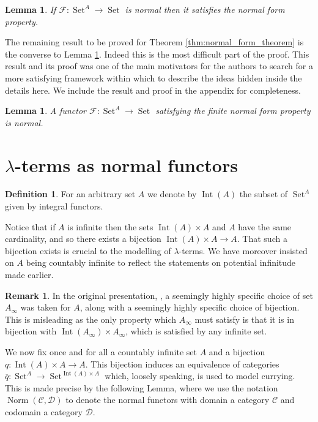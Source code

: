 \documentclass[12pt]{article}
\theoremstyle{plain}
\newtheorem{lemma}[thm]{Lemma}
\theoremstyle{definition}
\newtheorem{defn}[thm]{Definition} %
\newtheorem{remark}[thm]{Remark}
\newcommand{\scr}[1]{\mathscr{#1}}
\newcommand{\call}[1]{\mathcal{#1}}
\newcommand{\Ccal}{\call{C}}
\newcommand{\Dcal}{\call{D}}
\newcommand{\lto}{\longrightarrow}
\DeclareMathOperator{\set}{Set}
\begin{document}
	\begin{lemma}\label{lem:normal--->finite_normal_form_property}
		If $\scr{F}: \set^A \lto \set$ is normal then it satisfies the normal form property.
		\end{lemma}
	

The remaining result to be proved for Theorem \ref{thm:normal_form_theorem} is the converse to Lemma \ref{lem:normal--->finite_normal_form_property}. Indeed this is the most difficult part of the proof. This result and its proof was one of the main motivators for the authors to search for a more satisfying framework within which to describe the ideas hidden inside the details here. We include the result and proof in the appendix for completeness.
 
	\begin{lemma}\label{lem:normal_from_prop--->normal}
		A functor $\scr{F}: \set^A \lto \set$ satisfying the finite normal form property is normal.
		\end{lemma}

\section{$\lambda$-terms as normal functors}

\begin{defn}
    For an arbitrary set $A$ we denote by $\operatorname{Int}(A)$ the subset of $\set^A$ given by integral functors.
\end{defn}

Notice that if $A$ is infinite then the sets $\operatorname{Int}(A) \times A$ and $A$ have the same cardinality, and so there exists a bijection $\operatorname{Int}(A) \times A \lto A$. That such a bijection exists is crucial to the modelling of $\lambda$-terms. We have moreover insisted on $A$ being countably infinite to reflect the statements on potential infinitude made earlier.

\begin{remark}
    In the original presentation, \cite[Proposition 3.1]{Girard}, a seemingly highly specific choice of set $A_\infty$ was taken for $A$, along with a seemingly highly specific choice of bijection. This is misleading as the only property which $A_\infty$ must satisfy is that it is in bijection with $\operatorname{Int}(A_\infty) \times A_\infty$, which is satisfied by any infinite set.
\end{remark}

We now fix once and for all a countably infinite set $A$ and a bijection $q: \operatorname{Int}(A) \times A \lto A$. This bijection induces an equivalence of categories $\overline{q}: \set^A \lto \set^{\operatorname{Int}(A) \times A}$ which, loosely speaking, is used to model currying. This is made precise by the following Lemma, where we use the notation $\operatorname{Norm}(\Ccal, \Dcal)$ to denote the normal functors with domain a category $\Ccal$ and codomain a category $\Dcal$.
\end{document}
